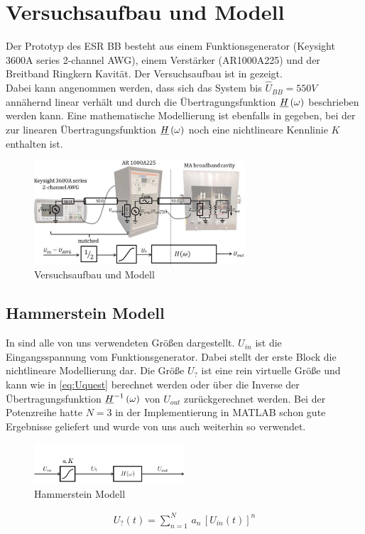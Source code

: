 \documentclass[../Report.tex]{subfiles}
\begin{document}
\section[Modell und Konvention]{Versuchsaufbau und Modell}
\label{sec:einf.modell_BB}
Der Prototyp des ESR BB besteht aus einem Funktionsgenerator (Keysight 3600A series 2-channel AWG), einem Verstärker (AR1000A225) und der Breitband Ringkern Kavität. Der Versuchsaufbau ist in  gezeigt.\\Dabei kann angenommen werden, dass sich das System bis $\hat{U}_{BB} = 550V$ annähernd linear verhält und durch die Übertragungsfunktion $\underline{H} \left( \omega \right)$ beschrieben werden kann. Eine mathematische Modellierung ist ebenfalls in  gegeben, bei der zur linearen Übertragungsfunktion $\underline{H} \left( \omega \right)$ noch eine nichtlineare Kennlinie $K$ enthalten ist.
\begin{figure}[H]
	\centering
	\includegraphics[width=0.7\textwidth]{images/eps/Aufbau.pdf}
	\caption{Versuchsaufbau und Modell}
  	\label{fig:Aufbau}
\end{figure}
\subsection{Hammerstein Modell}
\label{subsec:einf.modell_BB.hammerstein}
In  sind alle von uns verwendeten Größen dargestellt. $U_{in}$ ist die Eingangsspannung vom Funktionsgenerator. Dabei stellt der erste Block die nichtlineare Modellierung dar. Die Größe $U_{?}$ ist eine rein virtuelle Größe und kann wie in \ref{eq:Uquest} berechnet werden oder über die Inverse der Übertragungsfunktion $\underline{H}^{-1} \left( \omega \right)$ von $U_{out}$ zurückgerechnet werden. Bei der Potenzreihe hatte $N = 3$ in der Implementierung in MATLAB schon gute Ergebnisse geliefert und wurde von uns auch weiterhin so verwendet.
\begin{figure}[H]
	\centering
	\includegraphics[width=0.5\textwidth]{images/eps/Hammerstein.pdf}
	\caption{Hammerstein Modell}
  	\label{fig:Hammerstein}
\end{figure}
\begin{align}
	U_?(t)=\sum_{n=1}^N \, a_n \, \left[ U_{in}(t) \right]^n
	\label{eq:Uquest}
\end{align}
\end{document}
